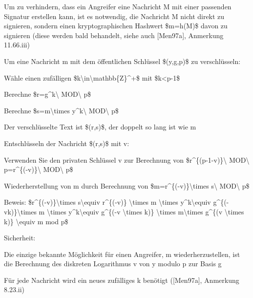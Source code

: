 \documentclass[a4paper]{article}
\begin{document}
\begin{multicols}{3}
\begin{itemize*}
\begin{itemize*}
                  \item Um zu verhindern, dass ein Angreifer eine Nachricht M mit einer passenden Signatur erstellen kann, ist es notwendig, die Nachricht M nicht direkt zu signieren, sondern einen kryptographischen Hashwert \$m=h(M)\$ davon zu signieren (diese werden bald behandelt, siehe auch {[}Men97a{]}, Anmerkung 11.66.iii)
            \end{itemize*}
            \item Um eine Nachricht m mit dem öffentlichen Schlüssel \$(y,g,p)\$ zu
            verschlüsseln:
            \begin{itemize*}
                  \item Wähle einen zufälligen \$k\textbackslash in\textbackslash mathbb\{Z\}\^{}+\$ mit \$k\textless p-1\$
                  \item Berechne \$r=g\^{}k\textbackslash{} MOD\textbackslash{} p\$
                  \item Berechne \$s=m\textbackslash times y\^{}k\textbackslash{} MOD\textbackslash{} p\$
                  \item Der verschlüsselte Text ist \$(r,s)\$, der doppelt so lang ist wie m
            \end{itemize*}
            \item Entschlüsseln der Nachricht \$(r,s)\$ mit v:
            \begin{itemize*}
                  \item Verwenden Sie den privaten Schlüssel v zur Berechnung von \$r\^{}\{(p-1-v)\}\textbackslash{} MOD\textbackslash{} p=r\^{}\{(-v)\}\textbackslash{} MOD\textbackslash{} p\$
                  \item Wiederherstellung von m durch Berechnung von \$m=r\^{}\{(-v)\}\textbackslash times s\textbackslash{} MOD\textbackslash{} p\$
                  \item Beweis: \$r\^{}\{(-v)\}\textbackslash times s\textbackslash equiv r\^{}\{(-v)\} \textbackslash times m \textbackslash times y\^{}k\textbackslash equiv g\^{}\{(-vk)\}\textbackslash times m \textbackslash times y\^{}k\textbackslash equiv g\^{}\{(-v \textbackslash times k)\} \textbackslash times m\textbackslash times g\^{}\{(v \textbackslash times k)\} \textbackslash equiv m mod p\$
            \end{itemize*}
            \item Sicherheit:
            \begin{itemize*}
                  \item Die einzige bekannte Möglichkeit für einen Angreifer, m wiederherzustellen, ist die Berechnung des diskreten Logarithmus v von y modulo p zur Basis g
                  \item Für jede Nachricht wird ein neues zufälliges k benötigt ({[}Men97a{]}, Anmerkung 8.23.ii)
            \end{itemize*}
      \end{itemize*}



\end{multicols}
\end{document}
